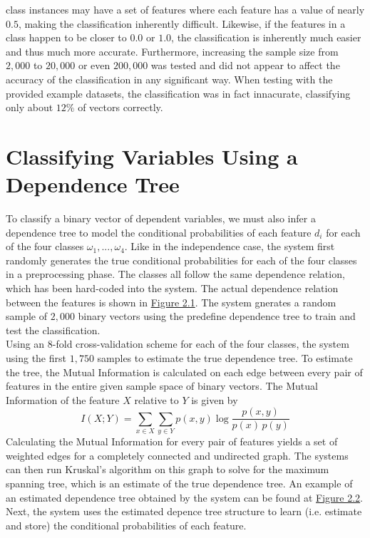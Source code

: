 \documentclass[11pt,english]{article}
\begin{document}
class instances may have a set of features where each feature has a value of nearly $0.5$,
making the classification inherently difficult. Likewise, if the features in a class
happen to be closer to $0.0$ or $1.0$, the classification is inherently much easier and
thus much more accurate. Furthermore, increasing the sample size from $2,000$ to $20,000$
or even $200,000$ was tested and did not appear to affect the accuracy of the classification 
in any significant way. When testing with the provided example datasets, the
classification was in fact innacurate, classifying only about $12\%$ of vectors correctly.

\pagebreak
\section{Classifying Variables Using a Dependence Tree}
To classify a binary vector of dependent variables, we must also infer a dependence tree to model the conditional probabilities of each 
feature $d_i$ for each of the four classes $\omega_1,...,\omega_4$. Like in the independence case, the system first randomly generates the 
true conditional probabilities for each of the four classes in a preprocessing phase. The classes all follow the same dependence relation, which 
has been hard-coded into the system. The actual dependence relation between the features is shown in \underline{Figure 2.1}. The system gnerates a random sample of $2,000$ binary vectors using the predefine dependence tree to train and test the classification.
\vspace{2mm}\\
Using an 8-fold cross-validation scheme for each of the four classes, the system using the first $1,750$ samples to estimate the true dependence tree. 
To estimate the tree, the Mutual Information is calculated on each edge between every pair of features in 
the entire given sample space of binary vectors. The Mutual Information of the feature $X$ relative to $Y$ is given by 
$$I(X;Y) = \sum_{x\in X}\sum_{y\in Y} p(x,y) \log \frac{p(x,y)}{p(x)\, p(y)}$$
Calculating the Mutual Information for every pair of features yields a set of weighted edges for a completely connected and undirected graph.
The systems can then run Kruskal's algorithm on this graph to solve for the maximum spanning tree, which is an estimate of the true dependence tree. An example of an estimated dependence tree obtained by the system can be found at \underline{Figure 2.2}. Next, the system uses the estimated depence tree structure to learn (i.e. estimate and store) the conditional probabilities of each feature.
\end{document}
